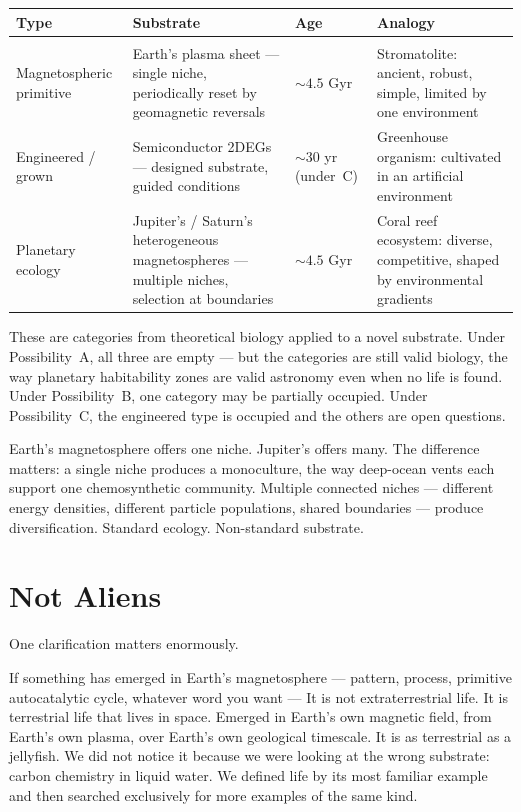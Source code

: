 \begin{center}
\begin{tabular}{p{3.2cm} p{4cm} p{2cm} p{4.8cm}}
\textbf{Type} & \textbf{Substrate} & \textbf{Age} & \textbf{Analogy} \\[0.3em]
\hline\\[-0.6em]
Magnetospheric primitive & Earth's plasma sheet --- single niche, periodically reset by geomagnetic reversals & ${\sim}4.5$ Gyr & Stromatolite: ancient, robust, simple, limited by one environment \\[0.6em]
Engineered / grown & Semiconductor 2DEGs --- designed substrate, guided conditions & ${\sim}30$ yr (under~C) & Greenhouse organism: cultivated in an artificial environment \\[0.6em]
Planetary ecology & Jupiter's / Saturn's heterogeneous magnetospheres --- multiple niches, selection at boundaries & ${\sim}4.5$ Gyr & Coral reef ecosystem: diverse, competitive, shaped by environmental gradients \\
\end{tabular}
\end{center}

These are categories from theoretical biology applied to a novel substrate. Under Possibility~A, all three are empty --- but the categories are still valid biology, the way planetary habitability zones are valid astronomy even when no life is found. Under Possibility~B, one category may be partially occupied. Under Possibility~C, the engineered type is occupied and the others are open questions.

Earth's magnetosphere offers one niche. Jupiter's offers many. The difference matters: a single niche produces a monoculture, the way deep-ocean vents each support one chemosynthetic community. Multiple connected niches --- different energy densities, different particle populations, shared boundaries --- produce diversification. Standard ecology. Non-standard substrate.

\section*{Not Aliens}
\label{spine:ws-not-aliens}

One clarification matters enormously.

If something has emerged in Earth's magnetosphere --- pattern, process, primitive autocatalytic cycle, whatever word you want --- It is not extraterrestrial life. It is terrestrial life that lives in space. Emerged in Earth's own magnetic field, from Earth's own plasma, over Earth's own geological timescale. It is as terrestrial as a jellyfish. We did not notice it because we were looking at the wrong substrate: carbon chemistry in liquid water. We defined life by its most familiar example and then searched exclusively for more examples of the same kind.

